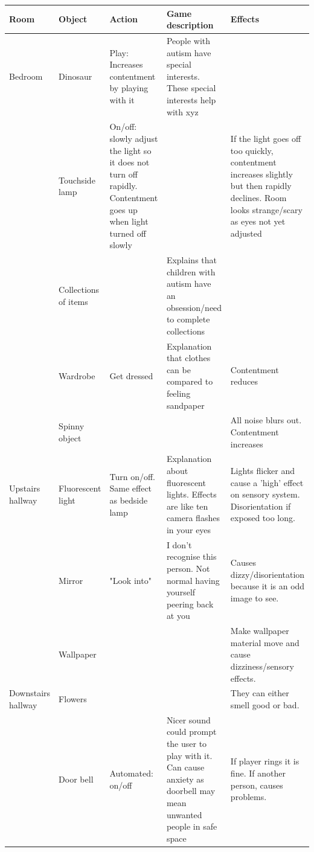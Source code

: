 \begin{table}[H]
    \begin{tabular}{| p{2cm} | p{2cm} | p{3cm} | p{3cm} | p{4cm} |}
    \hline
    Room & Object & Action & Game description & Effects                                                                  \\
    \hline
    \hline
     Bedroom & Dinosaur & Play: Increases contentment by playing with it & People with autism have special interests. These special interests help with xyz &                   \\
    \hline
    & Touchside lamp & On/off: slowly adjust the light so it does not turn off rapidly. Contentment goes up when light turned off slowly & & If the light goes off too quickly, contentment increases slightly but then rapidly declines. Room looks strange/scary as eyes not yet adjusted    \\
    \hline
    & Collections of items & & Explains that children with autism have an obsession/need to complete collections &  \\
    \hline
    & Wardrobe & Get dressed & Explanation that clothes can be compared to feeling sandpaper & Contentment reduces  \\
    \hline
   & Spinny object & & & All noise blurs out. Contentment increases \\
    \hline 
    Upstairs hallway & Fluorescent light & Turn on/off. Same effect as bedside lamp & Explanation about fluorescent lights. Effects are like ten camera flashes in your eyes & Lights flicker and cause a 'high' effect on sensory system. Disorientation if exposed too long. \\
    \hline
    & Mirror & "Look into" & I don't recognise this person. Not normal having yourself peering back at you & Causes dizzy/disorientation because it is an odd image to see. \\
    \hline
    & Wallpaper & & & Make wallpaper material move and cause dizziness/sensory effects. \\
    \hline
        Downstairs hallway & Flowers & & & They can either smell good or bad. \\
    \hline
    & Door bell & Automated: on/off & Nicer sound could prompt the user to play with it. Can cause anxiety as doorbell may mean unwanted people in safe space & If player rings it is fine. If another person, causes problems.
    \\
    \hline
    \end{tabular}
\end{table}

